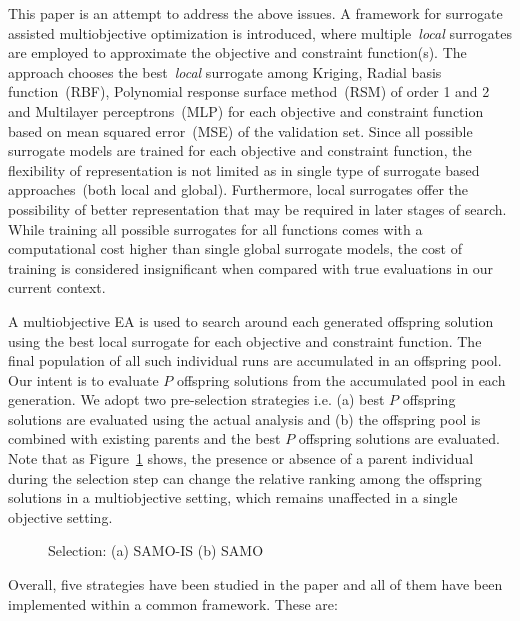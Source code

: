 This paper is an attempt to address the above issues. A framework for surrogate assisted
multiobjective optimization is introduced, where multiple~\emph{local} surrogates are employed to
approximate the objective and constraint function(s). The approach chooses the best~\textit{local}
surrogate among Kriging, Radial basis function~(RBF), Polynomial response surface method~(RSM) of
order 1 and 2 and Multilayer perceptrons~(MLP) for each objective and constraint function based on mean squared error~(MSE) of the validation set. Since all
possible surrogate models are trained for each objective and constraint function, the flexibility of
representation is not limited as in single type of surrogate based approaches~(both local and
global). Furthermore, local surrogates offer the possibility of better representation that may be
required in later stages of search. While training all possible surrogates for all functions comes
with a computational cost higher than single global surrogate models, the cost of training is
considered insignificant when compared with true evaluations in our current context.

A multiobjective EA is used to search around each generated offspring solution using the best local
surrogate for each objective and constraint function. The final population of all such individual runs are accumulated in an offspring pool.
Our intent is to evaluate $P$ offspring solutions from the accumulated pool in each generation. We adopt two pre-selection strategies i.e. (a)
best $P$ offspring solutions are evaluated using the actual analysis and (b) the offspring pool is combined with existing parents and the best $P$ offspring solutions are evaluated.
Note that as Figure~\ref{fig:selectiondiff} shows, the presence or absence of a parent individual during the
selection step can change the relative ranking among the offspring solutions in a multiobjective setting, which remains unaffected in a single objective setting.

\begin{figure}[!htb] \centering
	\caption{Selection: (a) SAMO-IS (b) SAMO} \label{fig:selectiondiff} \end{figure}

Overall, five strategies have been studied in the paper and all of them have been implemented within
a common framework. These are: 

